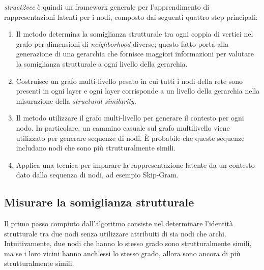 \documentclass[11pt]{article}
\begin{document}
\textit{struct2vec} è quindi un framework generale per l'apprendimento di rappresentazioni latenti per i nodi, composto dai seguenti quattro step principali:
\begin{enumerate}
\setlength{\itemsep}{1pt}
  \setlength{\parskip}{0pt}
  \setlength{\parsep}{0pt}
  \item Il metodo determina la somiglianza strutturale tra ogni coppia di vertici nel grafo per dimensioni di \textit{neighborhood} diverse; questo fatto porta alla generazione di una gerarchia che fornisce maggiori informazioni per valutare la somiglianza strutturale a ogni livello della gerarchia.
  \item Costruisce un grafo multi-livello pesato in cui tutti i nodi della rete sono presenti in ogni layer e ogni layer corrisponde a un livello della gerarchia nella misurazione della \textit{structural similarity}.
  \item Il metodo utilizzare il grafo multi-livello per generare il contesto per ogni nodo.
In particolare, un cammino casuale sul grafo multilivello viene utilizzato per generare sequenze di nodi. È probabile che queste sequenze includano nodi che sono più strutturalmente simili.
  \item Applica una tecnica per imparare la rappresentazione latente da un contesto dato dalla sequenza di nodi, ad esempio Skip-Gram.
\end{enumerate}

\subsection{Misurare la somiglianza strutturale}
Il primo passo compiuto dall'algoritmo consiste nel determinare l'identità strutturale tra due nodi senza utilizzare attribuiti di sia nodi che archi. Intuitivamente, due nodi che hanno lo stesso grado sono strutturalmente simili, ma se i loro vicini hanno anch'essi lo stesso grado, allora sono ancora di più strutturalmente simili.
\end{document}
